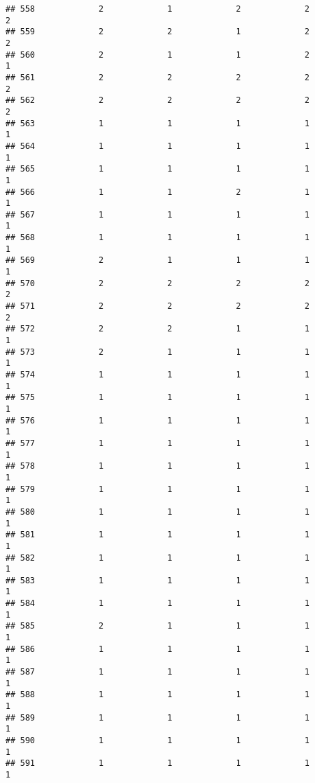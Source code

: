 \documentclass[
]{article}
\begin{document}
\begin{verbatim}
## 558             2             1             2             2             2
## 559             2             2             1             2             2
## 560             2             1             1             2             1
## 561             2             2             2             2             2
## 562             2             2             2             2             2
## 563             1             1             1             1             1
## 564             1             1             1             1             1
## 565             1             1             1             1             1
## 566             1             1             2             1             1
## 567             1             1             1             1             1
## 568             1             1             1             1             1
## 569             2             1             1             1             1
## 570             2             2             2             2             2
## 571             2             2             2             2             2
## 572             2             2             1             1             1
## 573             2             1             1             1             1
## 574             1             1             1             1             1
## 575             1             1             1             1             1
## 576             1             1             1             1             1
## 577             1             1             1             1             1
## 578             1             1             1             1             1
## 579             1             1             1             1             1
## 580             1             1             1             1             1
## 581             1             1             1             1             1
## 582             1             1             1             1             1
## 583             1             1             1             1             1
## 584             1             1             1             1             1
## 585             2             1             1             1             1
## 586             1             1             1             1             1
## 587             1             1             1             1             1
## 588             1             1             1             1             1
## 589             1             1             1             1             1
## 590             1             1             1             1             1
## 591             1             1             1             1             1

\end{verbatim}
\end{document}
